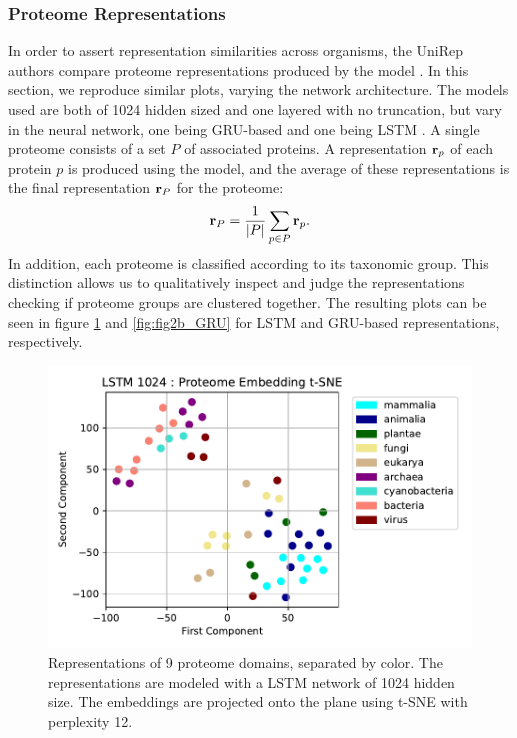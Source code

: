 \documentclass[a4paper,12pt]{article}
\begin{document}
\subsubsection{Proteome Representations}
\label{section:proteome}
In order to assert representation similarities across organisms, the UniRep authors compare proteome representations produced by the model \cite{alley2019unified}. In this section, we reproduce similar plots, varying the network architecture. The models used are both of 1024 hidden sized and one layered with no truncation, but vary in the neural network, one being GRU-based and one being LSTM . A single proteome consists of a set $P$ of associated proteins. A representation $\mathbf{ r }_p$ of each protein $p$ is produced using the model, and the average of these representations is the final representation $\mathbf{ r }_P$ for the proteome:
\[ \mathbf{ r }_P = \frac{1}{|P|} \sum_{p \in P} \mathbf{ r }_p. \]
In addition, each proteome is classified according to its taxonomic group. This distinction allows us to qualitatively inspect and judge the representations checking if proteome groups are clustered together. The resulting plots can be seen in figure \ref{fig:fig2b_LSTM} and \ref{fig:fig2b_GRU} for LSTM and GRU-based representations, respectively.

\begin{figure}[H]
    \centering
    \includegraphics[width=0.95\linewidth]{figures/fig2b_LSTM_1024_no_trunc.pdf}
    \caption{Representations of 9 proteome domains, separated by color. The representations are modeled with a LSTM network of 1024 hidden size. The embeddings are projected onto the plane using t-SNE with perplexity 12.}
    \label{fig:fig2b_LSTM}
\end{figure}
\end{document}
